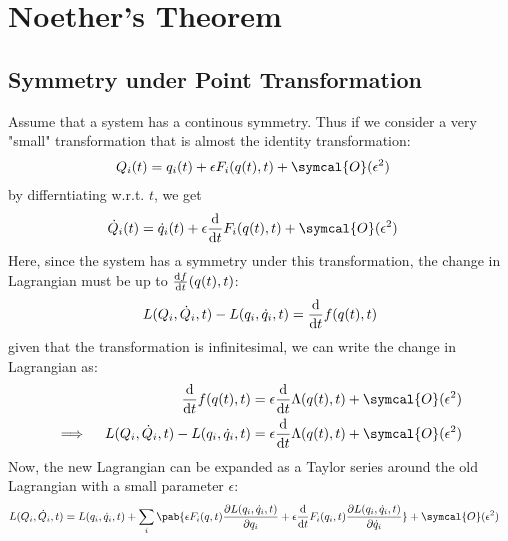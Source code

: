\section{Noether's Theorem}
\label{sec:proof-noether-theorem}
\subsection{Symmetry under Point Transformation}
Assume that a system has a continous symmetry.
Thus if we consider a very "small" transformation that is almost the identity transformation:
\begin{align}
  Q_i(t) & = q_i(t) + \epsilon F_i(q(t), t) + \symcal{O}(\epsilon^2)
\end{align}
by differntiating w.r.t. $t$, we get
\begin{align}
  \dot{Q}_i (t) & = \dot{q}_i(t) + \epsilon \odv{}{t} F_i(q(t), t) + \symcal{O}(\epsilon^2)
\end{align}
Here, since the system has a symmetry under this transformation, the change in Lagrangian must be up to $\odv{f}{t} (q(t), t)$:
\begin{align}
  L(Q_i, \dot{Q}_i, t) - L(q_i, \dot{q}_i, t) = \odv{}{t} f(q(t), t)
\end{align}
given that the transformation is infinitesimal, we can write the change in Lagrangian as:
\begin{align}
  \odv{}{t} f(q(t), t)                                       & = \epsilon \odv{}{t} \Lambda(q(t), t) + \symcal{O}(\epsilon^2) \\
  \implies \quad L(Q_i, \dot{Q}_i, t) - L(q_i, \dot{q}_i, t) & = \epsilon \odv{}{t} \Lambda(q(t), t) + \symcal{O}(\epsilon^2)
  \label{eq:change_lagrangian1}
\end{align}
Now, the new Lagrangian can be expanded as a Taylor series around the old Lagrangian with a small parameter $\epsilon$:
\begin{align}
  L(Q_i, \dot{Q}_i, t) & = L(q_i, \dot{q}_i, t) + \sum_i  \pab{
    \epsilon F_i(q, t) \pdv{L(q_i, \dot{q}_i, t)}{q_i} + \epsilon \odv{}{t} F_i(q_i, t) \pdv{L(q_i, \dot{q}_i, t)}{\dot{q}_i}
  } + \symcal{O}(\epsilon^2)
\end{align}
